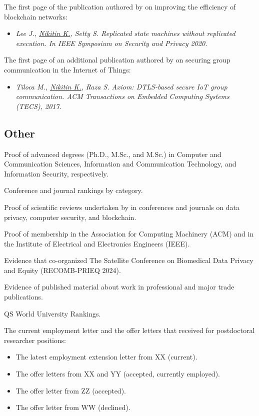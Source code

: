 \begin{thebibliography}{25}
The first page of the publication authored by \dr on improving the efficiency of
blockchain networks:
\begin{itemize}
	\item \textit{Lee J., \underline{Nikitin K.}, Setty S. Replicated state
	machines without replicated execution. In {IEEE} Symposium on Security and
	Privacy 2020.}
\end{itemize}

The first page of an additional publication authored by \dr on securing group
communication in the Internet of Things: 
\begin{itemize}
	\item \textit{Tiloca M., \underline{Nikitin K.}, Raza S. Axiom: {DTLS}-based
	secure {IoT} group communication. {ACM} Transactions on Embedded Computing
	Systems ({TECS}), 2017.}
\end{itemize}

\subsection*{Other}

Proof of \drfulls advanced degrees (Ph.D., M.Sc., and M.Sc.) in Computer
and Communication Sciences, Information and Communication Technology, and
Information Security, respectively.

Conference and journal rankings by category.

Proof of \numreviews scientific reviews undertaken by \dr in conferences and
journals on data privacy, computer security, and blockchain.

Proof of \drs membership in the Association for Computing Machinery (ACM) and
in the Institute of Electrical and Electronics Engineers (IEEE).

Evidence that \dr co-organized The Satellite Conference on Biomedical Data
Privacy and Equity (RECOMB-PRIEQ 2024).

Evidence of published material about \drs work in professional and major trade
publications.

QS World University Rankings.

The current employment letter and the offer letters that \dr received for postdoctoral researcher positions:
\begin{itemize}
	\item The latest employment extension letter from XX (current).
	\item The offer letters from XX and YY (accepted, currently employed).
	\item The offer letter from ZZ (accepted).
	\item The offer letter from WW (declined).
\end{itemize}


\end{thebibliography}
